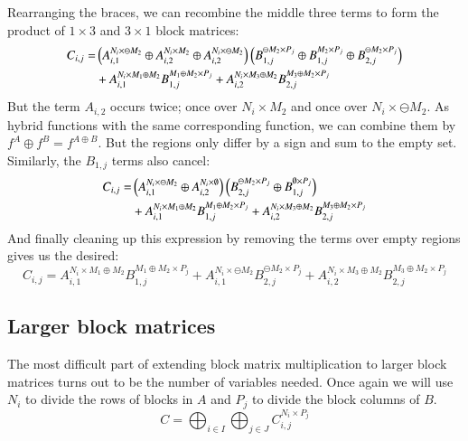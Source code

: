 Rearranging the braces, we can recombine the middle three terms to form the product of $1 \times 3$ and $3 \times 1$ block matrices:
\begin{align*}
	C_{i,j} 	=& \left( A_{i,1}^{N_i \times \ominus M_2} 
				\oplus  A_{i,2}^{N_i \times M_2} 
				\oplus A_{i,2}^{N_i \times \ominus M_2} \right)
			\left( B_{1,j}^{\ominus M_2 \times P_j} 
				\oplus B_{1,j}^{M_2 \times P_j} 
				\oplus B_{2,j}^{\ominus M_2 \times P_j} \right)\notag\\
			&+ A_{i,1}^{N_i \times M_1 \oplus M_2} B_{1,j}^{M_1 \oplus M_2 \times P_j} 
			+ A_{i,2}^{N_i \times M_3 \oplus M_2} B_{2,j}^{M_3 \oplus M_2 \times P_j} 
\end{align*}
But the term $A_{i,2}$ occurs twice; once over $N_i \times M_2$ and once over $N_i \times \ominus M_2$.
As hybrid functions with the same corresponding function, we can combine them by $f^A \oplus f^B = f^{A\oplus B}$.
But the regions only differ by a sign and sum to the empty set.
Similarly, the $B_{1,j}$ terms also cancel:
\begin{align*}
	C_{i,j} 	=& \left( A_{i,1}^{N_i \times \ominus M_2} \oplus  A_{i,2}^{N_i \times \emptyset}  \right)
			\left(  B_{2,j}^{\ominus M_2 \times P_j} \oplus B_{1,j}^{\emptyset \times P_j} \right)\notag\\
			&+ A_{i,1}^{N_i \times M_1 \oplus M_2} B_{1,j}^{M_1 \oplus M_2 \times P_j} 
			+ A_{i,2}^{N_i \times M_3 \oplus M_2} B_{2,j}^{M_3 \oplus M_2 \times P_j} 
\end{align*}
And finally cleaning up this expression by removing the terms over empty regions gives us the desired:
\begin{equation}
	C_{i,j} =  A_{i,1}^{N_i \times M_1 \oplus M_2} B_{1,j}^{M_1 \oplus M_2 \times P_j} 
			+ A_{i,1}^{N_i \times \ominus M_2} B_{2,j}^{\ominus M_2 \times P_j}
			+ A_{i,2}^{N_i \times M_3 \oplus M_2} B_{2,j}^{M_3 \oplus M_2 \times P_j}
\end{equation}

\subsection{Larger block matrices}

The most difficult part of extending block matrix multiplication to larger block matrices turns out to be the number of 
variables needed.
Once again we will use $N_i$ to divide the rows of blocks in $A$ and $P_j$ to divide the block columns of $B$.
\begin{equation}
	C = \bigoplus_{i \in I} \bigoplus_{j \in J} C_{i,j}^{N_i \times P_j}
\end{equation}

